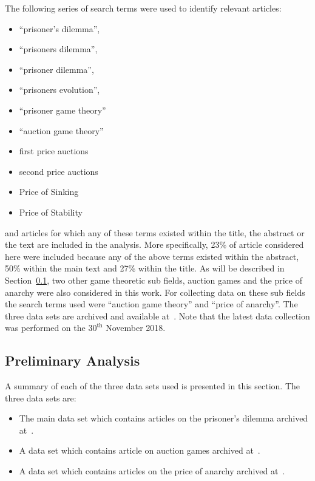 \documentclass{article}
\theoremstyle{definition}
\begin{document}
The following series of search terms were used to identify relevant articles:

\begin{itemize}
    \item ``prisoner's dilemma'',
    \item ``prisoners dilemma'',
    \item ``prisoner dilemma'',
    \item ``prisoners evolution'',
    \item ``prisoner game theory''
\end{itemize}

\begin{itemize}
    \item ``auction game theory''
    \item first price auctions
    \item second price auctions
\end{itemize}

\begin{itemize}
    \item Price of Sinking
    \item Price of Stability
\end{itemize}


and articles for which any of these terms existed within the title, the abstract
or the text are included in the analysis. More specifically, 23\% of article
considered here were included because any of the above terms existed within the
abstract, 50\% within the main text and 27\% within the title. As will be
described in Section~\ref{section:preliminary_analysis}, two other game
theoretic sub fields, auction games and the price of anarchy were also considered
in this work. For collecting data on these sub fields the search terms used were
``auction game theory'' and ``price of anarchy''. The three data sets are
archived and available at~\cite{auction_data_2018, anarchy_data_2018,
pd_data_2018}. Note that the latest data collection was performed on the \(30^{\text{th}}\)
November 2018.

\subsection{Preliminary Analysis}\label{section:preliminary_analysis}

A summary of each of the three data sets used is presented in this section.
The three data sets are:

\begin{itemize}
    \item The main data set which contains articles on the prisoner's dilemma archived at~\cite{pd_data_2018}.
    \item A data set which contains article on auction games archived at~\cite{auction_data_2018}.
    \item A data set which contains articles on the price of anarchy archived at~\cite{anarchy_data_2018}.
\end{itemize}
\end{document}
